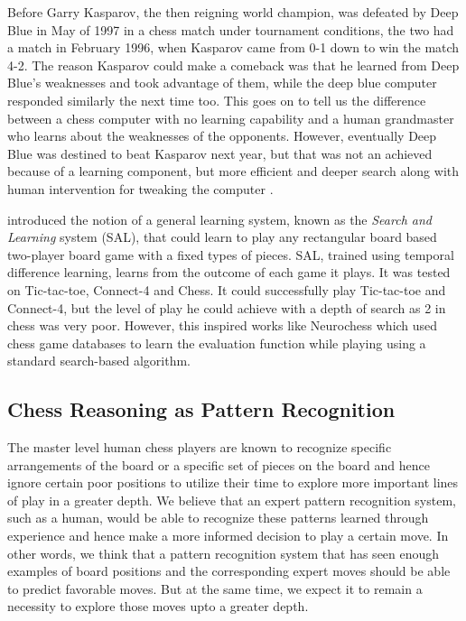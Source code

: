 Before Garry Kasparov, the then reigning world champion, was defeated by Deep 
Blue \cite{campbell2002deep} in May of 1997 in a chess match under tournament 
conditions, the two had a match in February 1996, when Kasparov came from 0-1 
down to win the match 4-2. The reason Kasparov could make a comeback was that 
he learned from Deep Blue's weaknesses and took advantage of them, while the 
deep blue computer responded similarly the next time too. This goes on to tell 
us the difference between a chess computer with no learning capability and a 
human grandmaster who learns about the weaknesses of the opponents. However, 
eventually Deep Blue was destined to beat Kasparov next year, but that was not 
an achieved because of a learning component, but more efficient and deeper 
search along with human intervention for tweaking the computer \cite{cnn-news}. 

\citet{gherrity1993game} introduced the notion of a general learning system, 
known as the \textit{Search and Learning} system (SAL), that could learn to 
play any rectangular board based two-player board game with a fixed types of 
pieces. SAL, trained using temporal difference learning, learns from the 
outcome of each game it plays. It was tested on Tic-tac-toe, Connect-4 and 
Chess. It could successfully play Tic-tac-toe and Connect-4, but the level of 
play he could achieve with a depth of search as 2 in chess was very poor. 
However, this inspired works like Neurochess \cite{thrun1995learning} which used 
chess game databases to learn the evaluation function while playing using a 
standard search-based algorithm.

\subsection{Chess Reasoning as Pattern Recognition}
\label{section:chess-as-pr}
The master level human chess players are known to recognize specific 
arrangements of the board or a specific set of pieces on the board and hence 
ignore certain poor positions to utilize their time to explore more important 
lines of play in a greater depth. We believe that an expert pattern recognition 
system, such as a human, would be able to recognize these patterns learned 
through experience and hence make a more informed decision to play a certain 
move. In other words, we think that a pattern recognition system that has seen 
enough examples of board positions and the corresponding expert moves should be 
able to predict favorable moves. But at the same time, we expect it to remain 
a necessity to explore those moves upto a greater depth.

